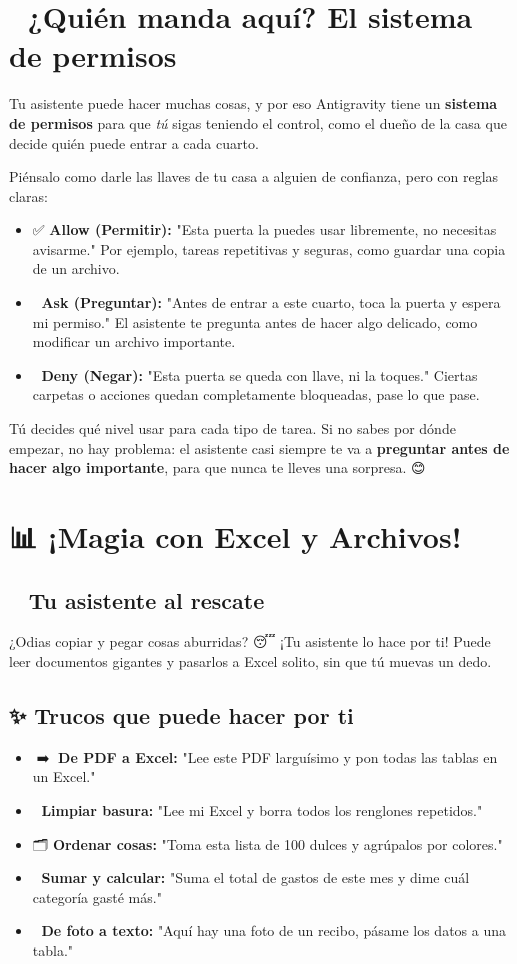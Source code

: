 \documentclass[12pt]{article}
\begin{document}
\newpage
\section{🔐 ¿Quién manda aquí? El sistema de permisos}
Tu asistente puede hacer muchas cosas, y por eso Antigravity tiene un \textbf{sistema de permisos} para que \textit{tú} sigas teniendo el control, como el dueño de la casa que decide quién puede entrar a cada cuarto. 🏡

Piénsalo como darle las llaves de tu casa a alguien de confianza, pero con reglas claras:
\begin{itemize}
    \item ✅ \textbf{Allow (Permitir):} "Esta puerta la puedes usar libremente, no necesitas avisarme." Por ejemplo, tareas repetitivas y seguras, como guardar una copia de un archivo.
    \item 🤝 \textbf{Ask (Preguntar):} "Antes de entrar a este cuarto, toca la puerta y espera mi permiso." El asistente te pregunta antes de hacer algo delicado, como modificar un archivo importante.
    \item 🚫 \textbf{Deny (Negar):} "Esta puerta se queda con llave, ni la toques." Ciertas carpetas o acciones quedan completamente bloqueadas, pase lo que pase.
\end{itemize}

Tú decides qué nivel usar para cada tipo de tarea. Si no sabes por dónde empezar, no hay problema: el asistente casi siempre te va a \textbf{preguntar antes de hacer algo importante}, para que nunca te lleves una sorpresa. 😊

\newpage
\section{📊 ¡Magia con Excel y Archivos!}

\subsection{🦸‍♂️ Tu asistente al rescate}
¿Odias copiar y pegar cosas aburridas? 😴 ¡Tu asistente lo hace por ti! Puede leer documentos gigantes y pasarlos a Excel solito, sin que tú muevas un dedo.

\subsection{✨ Trucos que puede hacer por ti}
\begin{itemize}
    \item 📄➡️📗 \textbf{De PDF a Excel:} "Lee este PDF larguísimo y pon todas las tablas en un Excel."
    \item 🧹 \textbf{Limpiar basura:} "Lee mi Excel y borra todos los renglones repetidos."
    \item 🗂️ \textbf{Ordenar cosas:} "Toma esta lista de 100 dulces y agrúpalos por colores."
    \item 🧮 \textbf{Sumar y calcular:} "Suma el total de gastos de este mes y dime cuál categoría gasté más."
    \item 📸 \textbf{De foto a texto:} "Aquí hay una foto de un recibo, pásame los datos a una tabla."
\end{itemize}
\end{document}
